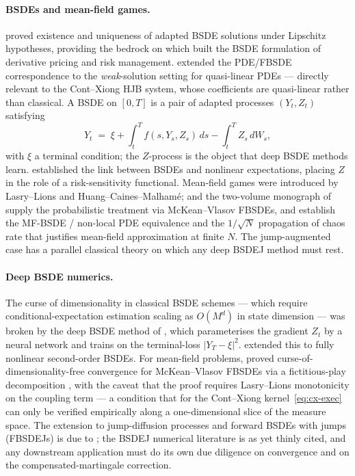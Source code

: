\documentclass[11pt,a4paper]{article}
\begin{document}
\paragraph{BSDEs and mean-field games.}
\citet{pardoux1990} proved existence and uniqueness of adapted BSDE
solutions under Lipschitz hypotheses, providing the bedrock on which
\citet{elkaroui1997} built the BSDE formulation of derivative pricing
and risk management.  \citet{feng2018} extended the PDE/FBSDE
correspondence to the \emph{weak}-solution setting for quasi-linear
PDEs --- directly relevant to the Cont--Xiong HJB system, whose
coefficients are quasi-linear rather than classical.  A BSDE on $[0,T]$ is a pair of adapted
processes $(Y_t, Z_t)$ satisfying
\begin{equation}\label{eq:bsde}
  Y_t \;=\; \xi + \int_t^T f(s, Y_s, Z_s)\,ds - \int_t^T Z_s \,dW_s,
\end{equation}
with $\xi$ a terminal condition; the $Z$-process is the object that
deep BSDE methods learn.  \citet{peng2004} established the link
between BSDEs and nonlinear expectations, placing $Z$ in the role
of a risk-sensitivity functional.  Mean-field games were introduced
by Lasry--Lions and Huang--Caines--Malham\'e; \citet{carmona2013}
and the two-volume monograph of \citet{carmona2018} supply the
probabilistic treatment via McKean--Vlasov FBSDEs, and
\citet{buckdahn2009viscosity, buckdahn2009limit} establish the
MF-BSDE / non-local PDE equivalence and the $1/\sqrt{N}$ propagation
of chaos rate that justifies mean-field approximation at finite
$N$.  The jump-augmented case has a parallel classical theory
\citep{tang1994, barles1997} on which any deep BSDEJ method must
rest.

\paragraph{Deep BSDE numerics.}
The curse of dimensionality in classical BSDE schemes
\citep{kloeden1992, pengxu2011} --- which require
conditional-expectation estimation scaling as $O(M^d)$ in state
dimension --- was broken by the deep BSDE method of \citet{han2018},
which parameterises the gradient $Z_t$ by a neural network and trains
on the terminal-loss $|Y_T - \xi|^2$.  \citet{beck2019} extended
this to fully nonlinear second-order BSDEs.  For mean-field problems,
\citet{han2022} proved curse-of-dimensionality-free convergence for
McKean--Vlasov FBSDEs via a fictitious-play decomposition
\citep{guo2023}, with the caveat that the proof requires Lasry--Lions
monotonicity on the coupling term --- a condition that for the
Cont--Xiong kernel~\eqref{eq:cx-exec} can only be verified empirically
along a one-dimensional slice of the measure space.  The extension
to jump-diffusion processes and forward BSDEs with jumps (FBSDEJs) is
due to \citet{wang2023}; the BSDEJ numerical literature is as yet
thinly cited, and any downstream application must do its own due
diligence on convergence and on the compensated-martingale correction.
\end{document}
